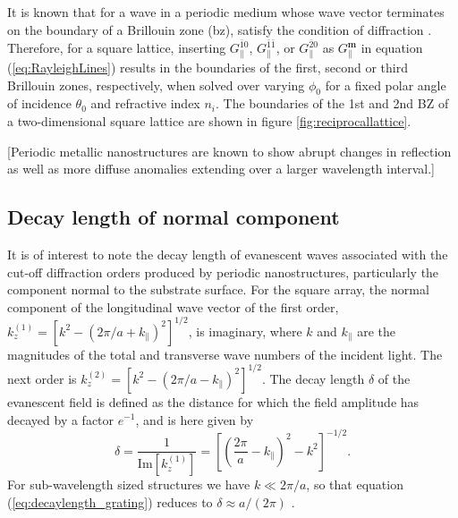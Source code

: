It is known that for a wave in a periodic medium whose wave vector terminates on the boundary of a Brillouin zone (\ac{bz}), satisfy the condition of diffraction .  Therefore, for a square lattice, inserting $G_\parallel^{\bar{1}0}$, $G_\parallel^{\bar{1}\bar{1}}$, or $G_\parallel^{\bar{2}0}$ as $G_\parallel^{\mathbf{m}}$ in equation (\ref{eq:RayleighLines}) results in the boundaries of the first, second or third Brillouin zones, respectively, when solved over varying $\phi_0$ for a fixed polar angle of incidence $\theta_0$ and refractive index $n_i$. The boundaries of the 1st and 2nd BZ of a two-dimensional square lattice are shown in figure \ref{fig:reciprocallattice}.




[Periodic metallic nanostructures are known to show abrupt changes in reflection as well as more diffuse anomalies extending over a larger wavelength interval.]

\subsection{Decay length of normal component}
It is of interest to note the decay length of evanescent waves associated with the cut-off diffraction orders produced by periodic nanostructures, particularly the component normal to the substrate surface. For the square array, the normal component of the longitudinal wave vector of the first order, $k_z^{(1)}=[k^2-(2\pi/a+k_\parallel)^2]^{1/2}$, is imaginary, where $k$ and $k_\parallel$ are the magnitudes of the total and transverse wave numbers of the incident light. The next order is $k_z^{(2)}=[k^2-(2\pi/a-k_\parallel)^2]^{1/2}$. The decay length $\delta$ of the evanescent field is defined as the distance for which the field amplitude has decayed by a factor $e^{-1}$, and is here given by \cite{decaylength_comsolsupport}
\begin{equation}
    \delta = \frac{1}{\text{Im}[k_z^{(1)}]} = \left [ \left ( \frac{2\pi}{a} - k_\parallel \right )^2 - k^2 \right ] ^{-1/2}.
    \label{eq:decaylength_grating}
\end{equation}
For sub-wavelength sized structures we have $k\ll2\pi/a$, so that equation (\ref{eq:decaylength_grating}) reduces to $\delta\approx a/(2\pi)$ \cite{decaylength_comsolsupport}.

